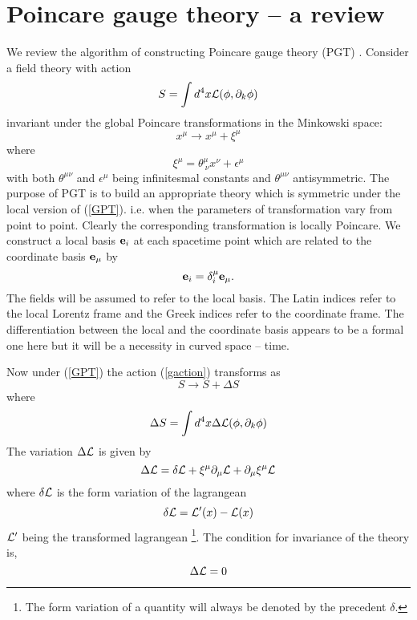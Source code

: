 \documentclass[12pt]{article}
\begin{document}
\section{Poincare gauge theory -- a review}
  We review the algorithm of constructing Poincare gauge theory (PGT) \cite{ U, Kibble:1961ba,Blagojevic:2002du}. Consider a field theory with action
 \begin{equation}
S = \int d^4x {\cal{{L}}}(\phi,\partial_{k}\phi)\label{gaction}
\end{equation} 
 invariant under 
   the global Poincare transformations in the Minkowski space:
\begin{equation}
x^\mu \rightarrow x^\mu + \xi^\mu\label{GPT}
\end{equation}
where 
$$\xi^\mu = \theta^\mu_{\ \nu}x^\nu + \epsilon^\mu$$
 with both $\theta^{\mu\nu}$ and $\epsilon^\mu$ being infinitesmal constants and $\theta^{\mu\nu}$ antisymmetric. The purpose of PGT is to build an appropriate theory which is symmetric under the local version of (\ref{GPT}). i.e. when the parameters of transformation vary from point to point. Clearly the corresponding transformation is locally Poincare. We construct a local basis ${\bf{e}}_i$  at each spacetime point which are related to the coordinate basis ${\bf{e}}_\mu$ by 
\begin{equation}
{\bf{e}}_i = \delta^\mu_i{\bf{e}}_\mu.\label{basis}
\end{equation}
The fields will be assumed to refer to the local basis. The Latin indices refer to the local Lorentz frame and the Greek indices refer to the coordinate frame. The differentiation between the local and the coordinate basis appears to be a formal one here but it will be a necessity in curved space -- time.

   Now
under (\ref{GPT}) the action (\ref{gaction}) transforms as $$S \to S + \Delta S$$ where
\begin{equation}
\Delta S = \int d^4x \Delta {\cal{{L}}}(\phi,\partial_{k}\phi) \label{gactionvar}
\end{equation}
The variation
 $\Delta{\cal{L}}$ is given by
\begin{equation}
\Delta{\cal{L}} = \delta{\cal{L}} + \xi^\mu\partial_\mu{\cal{L}}+ \partial_\mu\xi^\mu{\cal{L}}
\label{oinvariance}
\end{equation}
where $\delta{\cal{L}}$
 is the form variation of the lagrangean
\begin{equation}
\delta{\cal{L}} = {\cal{L^\prime}}(x) - {\cal{L}}(x)\label{fv}
\end{equation}
${\cal{L^\prime}}$ being the transformed lagrangean {\footnote{The form variation of a quantity will always be denoted by the precedent $\delta$.}}. The condition for invariance of the theory is,
\begin{equation}
\Delta{\cal{L}} = 0
\label{invariance}
\end{equation}
\end{document}
